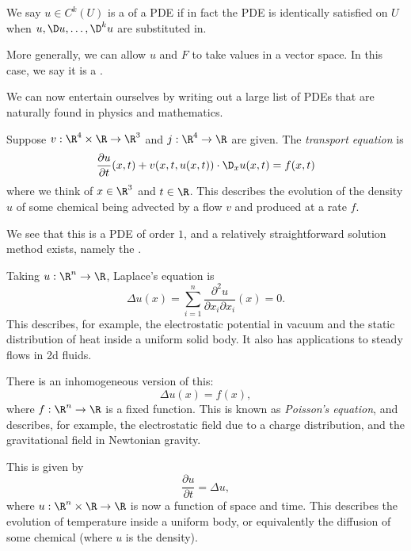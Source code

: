 \documentclass[a4paper]{article}
\begin{document}
\begin{defi}
  We say $u \in C^k(U)$ is a  of a PDE if in fact the PDE is identically satisfied on $U$ when $u, \D u, \ldots, \D^k u$ are substituted in.
\end{defi}

More generally, we can allow $u$ and $F$ to take values in a vector space. In this case, we say it is a .

We can now entertain ourselves by writing out a large list of PDEs that are naturally found in physics and mathematics.
\begin{eg}
  Suppose $v: \R^4 \times \R \to \R^3$ and $j: \R^4 \to \R$ are given. The \emph{transport equation} is
  \[
    \frac{\partial u}{\partial t}(x, t) + v(x, t, u(x, t)) \cdot \D_x u(x, t) = f(x, t)
  \]
  where we think of $x \in \R^3$ and $t \in \R$. This describes the evolution of the density $u$ of some chemical being advected by a flow $v$ and produced at a rate $f$.

  We see that this is a PDE of order $1$, and a relatively straightforward solution method exists, namely the .
\end{eg}

\begin{eg}
  Taking $u: \R^n \to \R$, Laplace's equation is
  \[
    \Delta u(x) = \sum_{i = 1}^n \frac{\partial^2 u}{\partial x_i \partial x_i} (x) = 0.
  \]
  This describes, for example, the electrostatic potential in vacuum and the static distribution of heat inside a uniform solid body. It also has applications to steady flows in 2d fluids.

  There is an inhomogeneous version of this:
  \[
    \Delta u(x) = f(x),
  \]
  where $f: \R^n \to \R$ is a fixed function. This is known as \emph{Poisson's equation}, and describes, for example, the electrostatic field due to a charge distribution, and the gravitational field in Newtonian gravity.
\end{eg}

\begin{eg}
  This is given by
  \[
    \frac{\partial u}{\partial t} = \Delta u,
  \]
  where $u: \R^n \times \R \to \R$ is now a function of space and time. This describes the evolution of temperature inside a uniform body, or equivalently the diffusion of some chemical (where $u$ is the density).
\end{eg}
\end{document}
